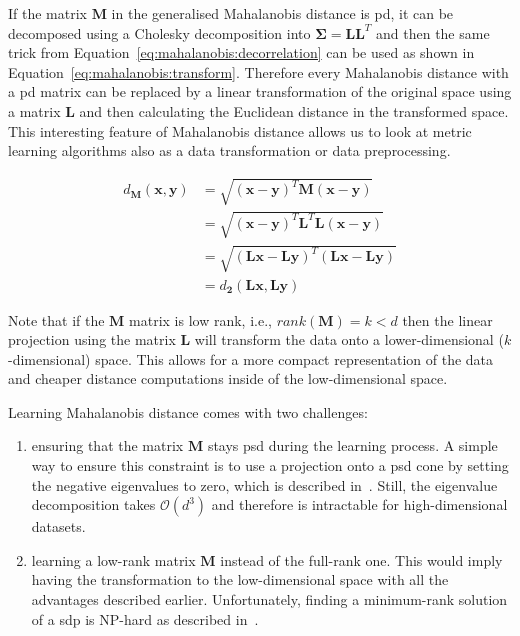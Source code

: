 \documentclass[12pt,a4paper]{report}
\begin{document}
If the matrix $\bm{M}$ in the generalised Mahalanobis distance is \ac{pd}, it can be decomposed using a Cholesky decomposition into $\bm{\Sigma}=\bm{L}\bm{L}^T$ and then the same trick from Equation~\ref{eq:mahalanobis:decorrelation} can be used as shown in Equation~\ref{eq:mahalanobis:transform}. Therefore every Mahalanobis distance with a \ac{pd} matrix can be replaced by a linear transformation of the original space using a matrix $\bm{L}$ and then calculating the Euclidean distance in the transformed space. This interesting feature of Mahalanobis distance allows us to look at metric learning algorithms also as a data transformation or data preprocessing.

\begin{align}
  d_{\bm{M}}(\textbf{x},\textbf{y}) &= \sqrt{(\textbf{x}-\textbf{y})^{T}\bm{M}(\textbf{x}-\textbf{y})} \nonumber\\
         &= \sqrt{(\textbf{x}-\textbf{y})^{T}\bm{L}^{T}\bm{L}(\textbf{x}-\textbf{y})} \nonumber\\
         &= \sqrt{(\bm{L}\textbf{x}-\bm{L}\textbf{y})^{T}(\bm{L}\textbf{x}-\bm{L}\textbf{y})} \nonumber\\
         &= d_{\bm{2}}(\bm{L}\textbf{x}, \bm{L}\textbf{y}) \label{eq:mahalanobis:transform}
\end{align}

Note that if the $\bm{M}$ matrix is low rank, i.e., $rank(\bm{M})=k<d$ then the linear projection using the matrix $\bm{L}$ will transform the data onto a lower-dimensional ($k$-dimensional) space. This allows for a more compact representation of the data and cheaper distance computations inside of the low-dimensional space.

Learning Mahalanobis distance comes with two challenges:
\begin{enumerate}
\item ensuring that the matrix $\bm{M}$ stays \ac{psd} during the learning process. A simple way to ensure this constraint is to use a projection onto a \ac{psd} cone by setting the negative eigenvalues to zero, which is described in~\citep{qian2015efficient}. Still, the eigenvalue decomposition takes $\mathcal{O}(d^3)$ and therefore is intractable for high-dimensional datasets.
\item learning a low-rank matrix $\bm{M}$ instead of the full-rank one. This would imply having the transformation to the low-dimensional space with all the advantages described earlier. Unfortunately, finding a minimum-rank solution of a \ac{sdp} is NP-hard as described in~\citep{lemon2016low}.
\end{enumerate}
\end{document}
